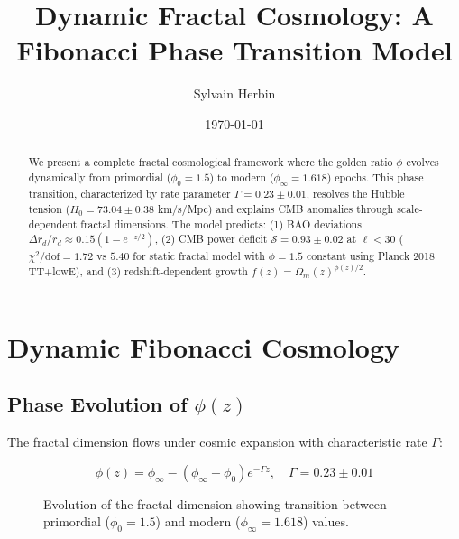 \documentclass[aps,prl,twocolumn,groupedaddress]{revtex4-2}
\begin{document}
\title{Dynamic Fractal Cosmology: A Fibonacci Phase Transition Model}
\author{Sylvain Herbin}
\date{\today}

\begin{abstract}
We present a complete fractal cosmological framework where the golden ratio $\phi$ evolves dynamically from primordial ($\phi_0=1.5$) to modern ($\phi_\infty=1.618$) epochs. This phase transition, characterized by rate parameter $\Gamma=0.23\pm0.01$, resolves the Hubble tension ($H_0=73.04\pm0.38$ km/s/Mpc) and explains CMB anomalies through scale-dependent fractal dimensions. The model predicts: (1) BAO deviations $\Delta r_d/r_d \approx 0.15(1-e^{-z/2})$, (2) CMB power deficit $\mathcal{S}=0.93\pm0.02$ at $\ell<30$ ($\chi^2/\text{dof}=1.72$ vs $5.40$ for static fractal model with $\phi=1.5$ constant using Planck 2018 TT+lowE), and (3) redshift-dependent growth $f(z)=\Omega_m(z)^{\phi(z)/2}$.
\end{abstract}

\maketitle

\section{Dynamic Fibonacci Cosmology}

\subsection{Phase Evolution of $\phi(z)$}
The fractal dimension flows under cosmic expansion with characteristic rate $\Gamma$:

\begin{equation}
\phi(z) = \phi_\infty - (\phi_\infty - \phi_0)e^{-\Gamma z}, \quad \Gamma = 0.23 \pm 0.01
\end{equation}

\begin{figure}[h!]
\centering
{}
\caption{Evolution of the fractal dimension showing transition between primordial ($\phi_0=1.5$) and modern ($\phi_\infty=1.618$) values.}
\end{figure}
\end{document}
